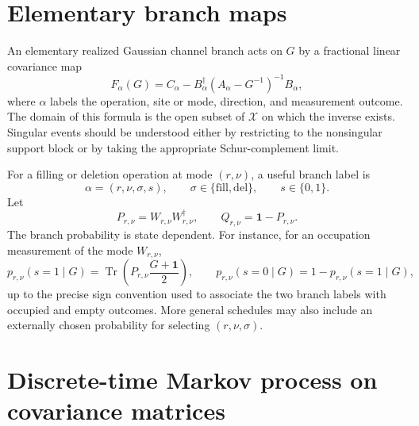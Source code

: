 \documentclass[aps,preprint,onecolumn,nofootinbib,superscriptaddress]{revtex4-2}
\newcommand{\I}{\mathbf{1}}
\newcommand{\Tr}{\operatorname{Tr}}
\newcommand{\cX}{\mathcal{X}}
\theoremstyle{definition}
\theoremstyle{plain}
\begin{document}
\section{Elementary branch maps}

An elementary realized Gaussian channel branch acts on \(G\) by a fractional
linear covariance map
\begin{equation}
  F_\alpha(G)
  =
  C_\alpha
  -
  B_\alpha^\dagger
  \left(A_\alpha-G^{-1}\right)^{-1}
  B_\alpha,
  \label{eq:branch-map}
\end{equation}
where \(\alpha\) labels the operation, site or mode, direction, and measurement
outcome. The domain of this formula is the open subset of \(\cX\) on which the
inverse exists. Singular events should be understood either by restricting to
the nonsingular support block or by taking the appropriate Schur-complement
limit.

For a filling or deletion operation at mode \((r,\nu)\), a useful branch label is
\begin{equation}
  \alpha=(r,\nu,\sigma,s),
  \qquad
  \sigma\in\{\mathrm{fill},\mathrm{del}\},
  \qquad
  s\in\{0,1\}.
\end{equation}
Let
\begin{equation}
  P_{r,\nu}=W_{r,\nu}W_{r,\nu}^\dagger,
  \qquad
  Q_{r,\nu}=\I-P_{r,\nu}.
\end{equation}
The branch probability is state dependent. For instance, for an occupation
measurement of the mode \(W_{r,\nu}\),
\begin{equation}
  p_{r,\nu}(s=1\mid G)
  =
  \Tr\!\left(P_{r,\nu}\frac{G+\I}{2}\right),
  \qquad
  p_{r,\nu}(s=0\mid G)
  =
  1-p_{r,\nu}(s=1\mid G),
  \label{eq:born-probability}
\end{equation}
up to the precise sign convention used to associate the two branch labels with
occupied and empty outcomes. More general schedules may also include an
externally chosen probability for selecting \((r,\nu,\sigma)\).

\section{Discrete-time Markov process on covariance matrices}
\end{document}
